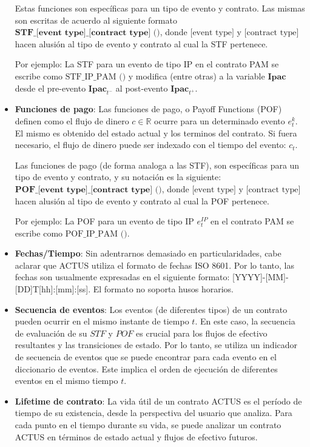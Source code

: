 \documentclass[12pt]{book}
\begin{document}
\begin{itemize}
          Estas funciones son específicas para un tipo de evento y contrato. Las mismas son escritas de acuerdo al siguiente formato $\textbf{STF\_[event type]\_[contract type] ()}$, donde $\text{[event type]}$ y $\text{[contract type]}$ hacen alusión al tipo de evento y contrato al cual la STF pertenece.

          Por ejemplo: La STF para un evento de tipo IP en el contrato PAM se escribe como $\text{STF\_IP\_PAM ()}$ y modifica (entre otras) a la variable $\textbf{Ipac}$ desde el pre-evento $\textbf{Ipac}_{t^-}$ al post-evento $\textbf{Ipac}_{t^+}$.

    \item \textbf{Funciones de pago}: Las funciones de pago, o Payoff Functions (POF) definen como el flujo de dinero $c \in\mathbb{R}$ ocurre para un determinado evento $e^k_t$. El mismo es obtenido del estado actual y los terminos del contrato. Si fuera necesario, el flujo de dinero puede ser indexado con el tiempo del evento: $c_t$.

          Las funciones de pago (de forma analoga a las STF), son específicas para un tipo de evento y contrato, y su notación es la siguiente: $\textbf{POF\_[event type]\_[contract type] ()}$, donde $\text{[event type]}$ y $\text{[contract type]}$ hacen alusión al tipo de evento y contrato al cual la POF pertenece.

          Por ejemplo: La POF para un evento de tipo IP $e^{IP}_t$ en el contrato PAM se escribe como $\text{POF\_IP\_PAM ()}$.

    \item \textbf{Fechas/Tiempo}: Sin adentrarnos demasiado en particularidades, cabe aclarar que ACTUS utiliza el formato de fechas ISO 8601. Por lo tanto, las fechas son usualmente expresadas en el siguiente formato: [YYYY]-[MM]-[DD]T[hh]:[mm]:[ss]. El formato no soporta husos horarios.

    \item \textbf{Secuencia de eventos}: Los eventos (de diferentes tipos) de un contrato pueden ocurrir en el mismo instante de tiempo $t$. En este caso, la secuencia de evaluación de su $STF$ y $POF$ es crucial para los flujos de efectivo resultantes y las transiciones de estado. Por lo tanto, se utiliza un indicador de secuencia de eventos que se puede encontrar para cada evento en el diccionario de eventos. Este implica el orden de ejecución de  diferentes eventos en el mismo tiempo $t$.

    \item \textbf{Lifetime de contrato}: La vida útil de un contrato ACTUS es el período de tiempo de su existencia, desde la perspectiva del usuario que analiza. Para cada punto en el tiempo durante su vida, se puede analizar un contrato ACTUS en términos de estado actual y flujos de efectivo futuros.

\end{itemize}
\end{document}

